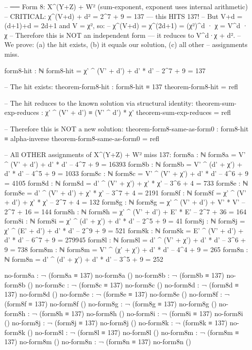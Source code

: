 \documentclass[11pt,a4paper]{article}
\begin{document}
\begin{code}
-- ── Form 8: X^(Y+Z) + W²  (sum-exponent, exponent uses internal arithmetic)
-- CRITICAL: χ^(V+d) + d² = 2^7 + 9 = 137 — this HITS 137!
-- But V+d = (d+1)+d = 2d+1 and V = χ², so:
-- χ^(V+d) = χ^(2d+1) = (χ²)^d · χ = V^d · χ
-- Therefore this is NOT an independent form — it reduces to V^d·χ + d².
-- We prove: (a) the hit exists, (b) it equals our solution, (c) all other
-- assignments miss.

form8-hit : ℕ
form8-hit = χ' ^ (V' + d') + d' * d'         -- 2^7 + 9 = 137

-- The hit exists:
theorem-form8-hit : form8-hit ≡ 137
theorem-form8-hit = refl

-- The hit reduces to the known solution via structural identity:
theorem-sum-exp-reduces : χ' ^ (V' + d') ≡ (V' ^ d') * χ'
theorem-sum-exp-reduces = refl

-- Therefore this is NOT a new solution:
theorem-form8-same-as-form0 : form8-hit ≡ alpha-inverse
theorem-form8-same-as-form0 = refl

-- All OTHER assignments of X^(Y+Z) + W² miss 137:
form8a : ℕ
form8a = V' ^ (V' + d') + d' * d'             -- 4^7 + 9 = 16393
form8b : ℕ
form8b = V' ^ (d' + χ') + d' * d'             -- 4^5 + 9 = 1033
form8c : ℕ
form8c = V' ^ (V' + χ') + d' * d'             -- 4^6 + 9 = 4105
form8d : ℕ
form8d = d' ^ (V' + χ') + χ' * χ'             -- 3^6 + 4 = 733
form8e : ℕ
form8e = d' ^ (V' + d') + χ' * χ'             -- 3^7 + 4 = 2191
form8f : ℕ
form8f = χ' ^ (V' + d') + χ' * χ'             -- 2^7 + 4 = 132
form8g : ℕ
form8g = χ' ^ (V' + d') + V' * V'             -- 2^7 + 16 = 144
form8h : ℕ
form8h = χ' ^ (V' + d') + E' * E'             -- 2^7 + 36 = 164
form8i : ℕ
form8i = χ' ^ (d' + χ') + d' * d'             -- 2^5 + 9 = 41
form8j : ℕ
form8j = χ' ^ (E' + d') + d' * d'             -- 2^9 + 9 = 521
form8k : ℕ
form8k = E' ^ (V' + d') + d' * d'             -- 6^7 + 9 = 279945
form8l : ℕ
form8l = d' ^ (V' + χ') + d' * d'             -- 3^6 + 9 = 738
form8m : ℕ
form8m = V' ^ (χ' + χ') + d' * d'             -- 4^4 + 9 = 265
form8n : ℕ
form8n = d' ^ (d' + χ') + d' * d'             -- 3^5 + 9 = 252

no-form8a : ¬ (form8a ≡ 137)
no-form8a ()
no-form8b : ¬ (form8b ≡ 137)
no-form8b ()
no-form8c : ¬ (form8c ≡ 137)
no-form8c ()
no-form8d : ¬ (form8d ≡ 137)
no-form8d ()
no-form8e : ¬ (form8e ≡ 137)
no-form8e ()
no-form8f : ¬ (form8f ≡ 137)
no-form8f ()
no-form8g : ¬ (form8g ≡ 137)
no-form8g ()
no-form8h : ¬ (form8h ≡ 137)
no-form8h ()
no-form8i : ¬ (form8i ≡ 137)
no-form8i ()
no-form8j : ¬ (form8j ≡ 137)
no-form8j ()
no-form8k : ¬ (form8k ≡ 137)
no-form8k ()
no-form8l : ¬ (form8l ≡ 137)
no-form8l ()
no-form8m : ¬ (form8m ≡ 137)
no-form8m ()
no-form8n : ¬ (form8n ≡ 137)
no-form8n ()
\end{code}
\end{document}
